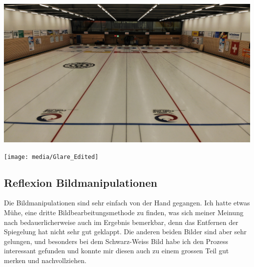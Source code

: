 \documentclass[11pt]{article}
\begin{document}
    \noindent
    \begin{minipage}{0.5\textwidth}
        \includegraphics[width=\linewidth]{media/Glare_Unedited}
    \end{minipage}
    \hfill
    \begin{minipage}[c]{0.5\textwidth}
        \texttt{[image: media/Glare\_Edited]}
    \end{minipage}

    \subsection{Reflexion Bildmanipulationen}
    Die Bildmanipulationen sind sehr einfach von der Hand gegangen. Ich hatte etwas Mühe, eine dritte Bildbearbeitungsmethode zu finden, was
    sich meiner Meinung nach bedauerlicherweise auch im Ergebnis bemerkbar, denn das Entfernen der Spiegelung hat nicht sehr gut geklappt. Die anderen
    beiden Bilder sind aber sehr gelungen, und besonders bei dem Schwarz-Weiss Bild habe ich den Prozess interessant gefunden und konnte mir
    diesen auch zu einem grossen Teil gut merken und nachvollziehen.

    \pagebreak
\end{document}
